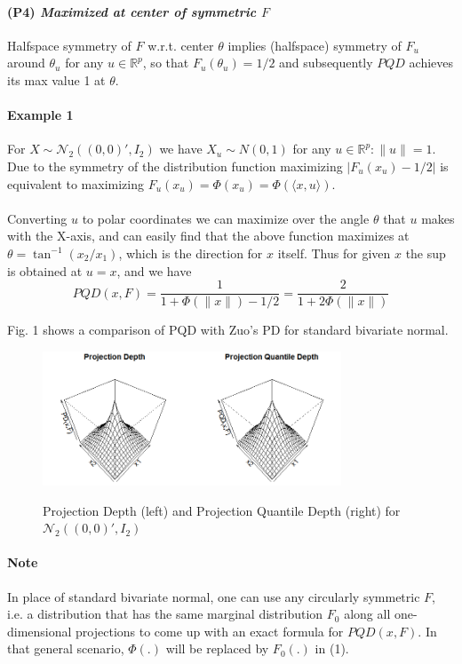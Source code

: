 \documentclass{article}
\begin{document}
\paragraph{(P4) \textit{Maximized at center of symmetric $F$}} Halfspace symmetry of $F$ w.r.t. center $\theta$ implies (halfspace) symmetry of $F_u$ around $\theta_u$ for any $u\in\mathbb{R}^p$, so that $F_u(\theta_u)=1/2$ and subsequently $PQD$ achieves its max value 1 at $\theta$.

\paragraph{Example 1}For $X\sim \mathcal{N}_2((0,0)',I_2)$ we have $X_u\sim N(0,1)$ for any $u\in\mathbb{R}^p: \|u\|=1$. Due to the symmetry of the distribution function maximizing $|F_u(x_u)-1/2|$ is equivalent to maximizing $F_u(x_u)=\Phi(x_u) = \Phi(\langle x,u\rangle)$.

\paragraph{} Converting $u$ to polar coordinates we can maximize over the angle $\theta$ that $u$ makes with the X-axis, and can easily find that the above function maximizes at $\theta = \tan^{-1}(x_2/x_1)$, which is the direction for $x$ itself. Thus for given $x$ the sup is obtained at $u=x$, and we have
\begin{equation}
PQD(x,F) = \frac{1}{1+\Phi(\|x\|)-1/2} = \frac{2}{1+2\Phi(\|x\|)}
\end{equation}

Fig. 1 shows a comparison of PQD with Zuo's PD for standard bivariate normal.
\begin{figure}[t]
	\centering
		\includegraphics[height=4cm]{pd_vs_pqd_bvn3d.png}\\
	\label{fig:fig1}
	\caption{Projection Depth (left) and Projection Quantile Depth (right) for $\mathcal{N}_2((0,0)',I_2)$}
\end{figure}
\paragraph{Note} In place of standard bivariate normal, one can use any circularly symmetric $F$, i.e. a distribution that has the same marginal distribution $F_0$ along all one-dimensional projections to come up with an exact formula for $PQD(x,F)$. In that general scenario, $\Phi(.)$ will be replaced by $F_0(.)$ in (1).
\end{document}
